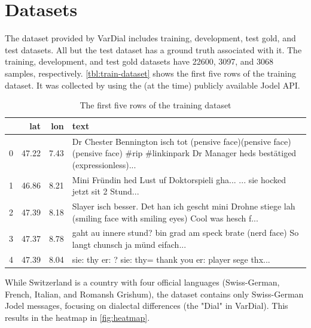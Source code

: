 \section{Datasets}
\label{sec:datasets}

The dataset provided by VarDial includes training, development, test gold, and test datasets. All but the test dataset has a ground truth associated with it. The training, development, and test gold datasets have 22600, 3097, and 3068 samples, respectively. \autoref{tbl:train-dataset} shows the first five rows of the training dataset. It was collected by \cite[2-3]{hovyCapturingRegionalVariation2018} using the (at the time) publicly available Jodel API.

\begin{table}
    \centering
    \begin{tabular}{l|rr|p{}}
        \toprule
          & lat   & lon  & text                                                                                                                                        \\
        \midrule
        0 & 47.22 & 7.43 & Dr Chester Bennington isch tot (pensive face)(pensive face)(pensive face) \#rip \#linkinpark Dr Manager heds bestätiged (expressionless)... \\
        1 & 46.86 & 8.21 & Mini Fründin hed Lust uf Doktorspieli gha... ... sie hocked jetzt sit 2 Stund...                                                            \\
        2 & 47.39 & 8.18 & Slayer isch besser. Det han ich gescht mini Drohne stiege lah (smiling face with smiling eyes) Cool was hesch f...                          \\
        3 & 47.37 & 8.78 & gaht au innere stund? bin grad am speck brate (nerd face) So langt chunsch ja münd eifach...                                                \\
        4 & 47.39 & 8.04 & sie: thy er: ? sie: thy= thank you er: player sege thx...                                                                                   \\
        \bottomrule
    \end{tabular}
    \caption{The first five rows of the training dataset}
    \label{tbl:train-dataset}
\end{table}

While Switzerland is a country with four official languages (Swiss-German, French, Italian, and Romansh Grishum), the dataset contains only Swiss-German Jodel messages, focusing on dialectal differences (the "Dial" in VarDial). This results in the heatmap in \autoref{fig:heatmap}.

